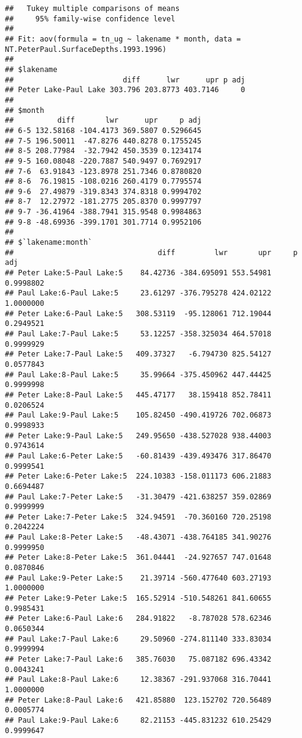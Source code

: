 \documentclass[]{article}
\begin{document}
\begin{verbatim}
##   Tukey multiple comparisons of means
##     95% family-wise confidence level
## 
## Fit: aov(formula = tn_ug ~ lakename * month, data = NT.PeterPaul.SurfaceDepths.1993.1996)
## 
## $lakename
##                         diff      lwr      upr p adj
## Peter Lake-Paul Lake 303.796 203.8773 403.7146     0
## 
## $month
##          diff       lwr      upr     p adj
## 6-5 132.58168 -104.4173 369.5807 0.5296645
## 7-5 196.50011  -47.8276 440.8278 0.1755245
## 8-5 208.77984  -32.7942 450.3539 0.1234174
## 9-5 160.08048 -220.7887 540.9497 0.7692917
## 7-6  63.91843 -123.8978 251.7346 0.8780820
## 8-6  76.19815 -108.0216 260.4179 0.7795574
## 9-6  27.49879 -319.8343 374.8318 0.9994702
## 8-7  12.27972 -181.2775 205.8370 0.9997797
## 9-7 -36.41964 -388.7941 315.9548 0.9984863
## 9-8 -48.69936 -399.1701 301.7714 0.9952106
## 
## $`lakename:month`
##                                 diff         lwr       upr     p adj
## Peter Lake:5-Paul Lake:5    84.42736 -384.695091 553.54981 0.9998802
## Paul Lake:6-Paul Lake:5     23.61297 -376.795278 424.02122 1.0000000
## Peter Lake:6-Paul Lake:5   308.53119  -95.128061 712.19044 0.2949521
## Paul Lake:7-Paul Lake:5     53.12257 -358.325034 464.57018 0.9999929
## Peter Lake:7-Paul Lake:5   409.37327   -6.794730 825.54127 0.0577843
## Paul Lake:8-Paul Lake:5     35.99664 -375.450962 447.44425 0.9999998
## Peter Lake:8-Paul Lake:5   445.47177   38.159418 852.78411 0.0206524
## Paul Lake:9-Paul Lake:5    105.82450 -490.419726 702.06873 0.9998933
## Peter Lake:9-Paul Lake:5   249.95650 -438.527028 938.44003 0.9743614
## Paul Lake:6-Peter Lake:5   -60.81439 -439.493476 317.86470 0.9999541
## Peter Lake:6-Peter Lake:5  224.10383 -158.011173 606.21883 0.6694487
## Paul Lake:7-Peter Lake:5   -31.30479 -421.638257 359.02869 0.9999999
## Peter Lake:7-Peter Lake:5  324.94591  -70.360160 720.25198 0.2042224
## Paul Lake:8-Peter Lake:5   -48.43071 -438.764185 341.90276 0.9999950
## Peter Lake:8-Peter Lake:5  361.04441  -24.927657 747.01648 0.0870846
## Paul Lake:9-Peter Lake:5    21.39714 -560.477640 603.27193 1.0000000
## Peter Lake:9-Peter Lake:5  165.52914 -510.548261 841.60655 0.9985431
## Peter Lake:6-Paul Lake:6   284.91822   -8.787028 578.62346 0.0650344
## Paul Lake:7-Paul Lake:6     29.50960 -274.811140 333.83034 0.9999994
## Peter Lake:7-Paul Lake:6   385.76030   75.087182 696.43342 0.0043241
## Paul Lake:8-Paul Lake:6     12.38367 -291.937068 316.70441 1.0000000
## Peter Lake:8-Paul Lake:6   421.85880  123.152702 720.56489 0.0005774
## Paul Lake:9-Paul Lake:6     82.21153 -445.831232 610.25429 0.9999647

\end{verbatim}
\end{document}
